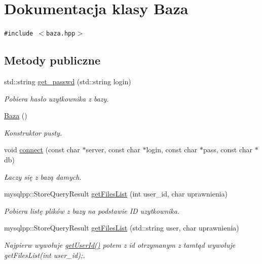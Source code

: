 \hypertarget{a00001}{
\section{Dokumentacja klasy Baza}
\label{d8/d84/a00001}
}
{\tt \#include $<$baza.hpp$>$}

\subsection*{Metody publiczne}
\begin{CompactItemize}
\item 
std::string \hyperlink{a00001_a09b37e4665bd7b2f2b8b54f8120f5be}{get\_\-passwd} (std::string login)
\begin{CompactList}\small\item\em Pobiera hasło uzytkownika z bazy. \item\end{CompactList}\item 
\hyperlink{a00001_8edd83a7fa98b203a1ab58157a1660a4}{Baza} ()
\begin{CompactList}\small\item\em Konstruktor pusty. \item\end{CompactList}\item 
void \hyperlink{a00001_bef61cc396e46d347a47c75e9ef8dfde}{connect} (const char $\ast$server, const char $\ast$login, const char $\ast$pass, const char $\ast$db)
\begin{CompactList}\small\item\em Łaczy się z bazą damych. \item\end{CompactList}\item 
mysqlpp::StoreQueryResult \hyperlink{a00001_a391c1fd3cb3f0b178ceeed9e4d8652e}{getFilesList} (int user\_\-id, char uprawnienia)
\begin{CompactList}\small\item\em Pobiera listę plików z bazy na podstawie ID uzytkownika. \item\end{CompactList}\item 
mysqlpp::StoreQueryResult \hyperlink{a00001_a90465dbd3a416904aee22161a96cde2}{getFilesList} (std::string user, char uprawnienia)
\begin{CompactList}\small\item\em Najpierw wywołuje \hyperlink{a00001_65054f08c8fd7c600f6c2fe2c7f61a43}{getUserId()} potem z id otrzymanym z tamtąd wywołuje getFilesList(int user\_\-id);. \item\end{CompactList}\item 

\end{CompactItemize}
